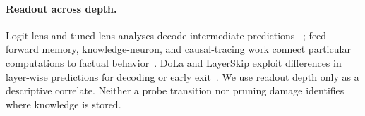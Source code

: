 \paragraph{Readout across depth.}
Logit-lens and tuned-lens analyses decode intermediate predictions
~\citep{nostalgebraist2020logitlens,tunedlens}; feed-forward memory,
knowledge-neuron, and causal-tracing work connect particular computations to
factual behavior~\citep{geva2021transformer,dai2022knowledge,
meng2022locating}. DoLa and LayerSkip exploit differences in layer-wise
predictions for decoding or early exit~\citep{chuang2024dola,layerskip}.
We use readout depth only as a descriptive correlate. Neither a probe
transition nor pruning damage identifies where knowledge is stored.
